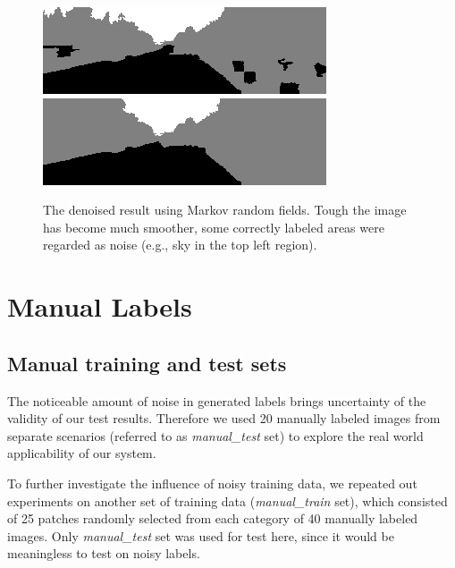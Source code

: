 \begin{figure}[h!]
\centering
\includegraphics[width=0.7\linewidth]{pics/super.png}
\includegraphics[width=0.7\linewidth]{pics/denoise.png}
\caption{The denoised result using Markov random fields. Tough the image has become much smoother, some correctly labeled areas were regarded as noise (e.g., sky in the top left region).}
\label{mrfpredfig}
\end{figure}

\section{Manual Labels}
\subsection{Manual training and test sets}
The noticeable amount of noise in generated labels brings uncertainty of the validity of our test results. Therefore we used 20 manually labeled images from separate scenarios (referred to as \textit{manual\_test} set) to explore the real world applicability of our system.

To further investigate the influence of noisy training data, we repeated out experiments on another set of training data (\textit{manual\_train} set), which consisted of 25 patches randomly selected from each category of 40 manually labeled images. Only \textit{manual\_test} set was used for test here, since it would be meaningless to test on noisy labels.

